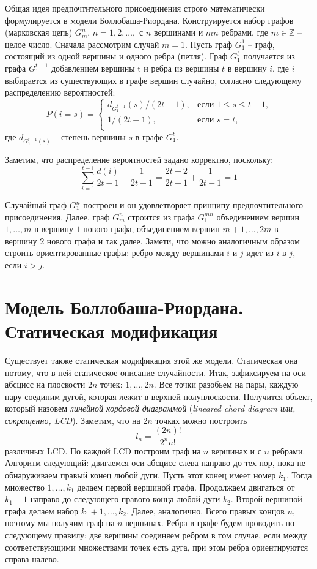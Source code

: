 \documentclass[14pt]{extreport}
\begin{document}
Общая идея предпочтительного присоединения строго математически формулируется в модели Боллобаша-Риордана. Конструируется набор графов (марковская цепь) $G_m^n$, $n=1, 2, \dots,$ с $n$ вершинами и $mn$ ребрами, где $m \in \mathbb{Z}$ -- целое число. Сначала рассмотрим случай $m = 1$. Пусть граф $G_1^1$ -- граф, состоящий из одной вершины и одного ребра (петля). Граф $G_1^t$ получается из графа $G_1^{t-1}$ добавлением вершины t и ребра из вершины $t$ в вершину $i$, где $i$ выбирается из существующих в графе вершин случайно, согласно следующему распределению вероятностей:
$$  
P(i=s) =
\begin{cases}  
  d_{G_1^{t-1}}(s)/(2t-1),&\text{если $1 \le s \le t-1$,}\\
  1/(2t-1),&\text{если $s=t$,}\\
\end{cases}
$$  
где $d_{G_1^{t-1}(s)}$ -- степень вершины $s$ в графе $G_1^t$. 

Заметим, что распределение вероятностей задано корректно, поскольку:
$$
\sum_{i=1}^{t-1}\frac{d(i)}{2t-1} + \frac{1}{2t-1}=\frac{2t-2}{2t-1}+\frac{1}{2t-1}=1
$$

Случайный граф $G_1^n$ построен и он удовлетворяет принципу предпочтительного присоединения. Далее, граф $G_m^n$ строится из графа $G_1^{mn}$ объединением вершин $1, \dots, m$ в вершину $1$ нового графа, объединением вершин $m+1, \dots, 2m$ в вершину 2 нового графа и так далее. Замети, что можно аналогичным образом строить ориентированные графы: ребро между вершинами $i$ и $j$ идет из $i$ в $j$, если $i > j$.

\section{Модель Боллобаша-Риордана. Статическая модификация}

Существует также статическая модификация этой же модели. Статическая она потому, что в ней статическое описание случайности.
Итак, зафиксируем на оси абсцисс на плоскости $2n$ точек: $1, \dots, 2n$. Все точки разобьем на пары, каждую пару соединим дугой, которая лежит в верхней полуплоскости. Получится объект, который назовем {\it линейной хордовой диаграммой} ({\it lineared chord diagram или, сокращенно, LCD}). Заметим, что на $2n$ точках можно построить
$$
l_n = \frac{(2n)!}{2^nn!}
$$
различных LCD. По каждой LCD построим граф на $n$ вершинах и с $n$ ребрами. Алгоритм следующий: двигаемся оси абсцисс слева направо до тех пор, пока не обнаруживаем правый конец любой дуги. Пусть этот конец имеет номер $k_1$. Тогда множество ${1, \dots, k_1}$ делаем первой вершиной графа. Продолжаем двигаться от $k_1 + 1$ направо до следующего правого конца любой дуги $k_2$. Второй вершиной графа делаем набор ${k_1 + 1, \dots, k_2}$. Далее, аналогично. Всего правых концов $n$, поэтому мы получим граф на $n$ вершинах. Ребра в графе будем проводить по следующему правилу: две вершины соединяем ребром в том случае, если между соответствующими множествами точек есть дуга, при этом ребра ориентируются справа налево.
\end{document}
